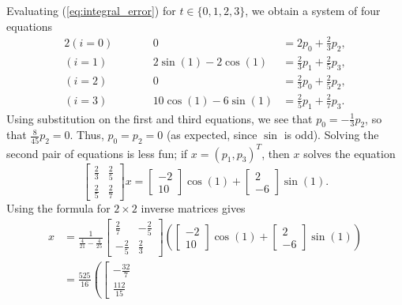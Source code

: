 \documentclass{homework}
\begin{document}
\begin{alphaparts}
		Evaluating (\ref{eq:integral_error}) for $t \in \{0,1,2,3\}$, we obtain a system of four equations
		\begin{alignat}{2}
			(i=0)&& \qquad 0 &= 2p_0+ \frac{2}{3}p_2, \\
			(i=1)&& \qquad 2\sin(1)-2\cos(1) &= \frac{2}{3}p_1 + \frac{2}{5}p_3, \\
			(i=2)&& \qquad 0 &= \frac{2}{3}p_0 + \frac{2}{5}p_2, \\
			(i=3)&& \qquad 10\cos(1) -6\sin(1) &= \frac{2}{5}p_1 + \frac{2}{7}p_3.
		\end{alignat}
		Using substitution on the first and third equations, we see that $p_0 = -\frac{1}{3}p_2$, so that $\frac{8}{45}p_2 = 0$. Thus, $p_0 = p_2 = 0$ (as expected, since $\sin$ is odd). Solving the second pair of equations is less fun; if $x = (p_1, p_3)^T$, then $x$ solves the equation
		\begin{equation}
			\left[\begin{matrix}
				\frac{2}{3} & \frac{2}{5} \\[0.5em]
				\frac{2}{5} & \frac{2}{7}
			\end{matrix}\right] x = \left[\begin{matrix}
				-2 \\
				10
			\end{matrix}\right]\cos(1) + \left[\begin{matrix}
			2 \\
			-6
		\end{matrix}\right]\sin(1).
		\end{equation}
		Using the formula for $2\times 2$ inverse matrices gives
		\begin{align}
			x &= \frac{1}{\frac{4}{21} - \frac{4}{25}}\left[\begin{matrix}
				\frac{2}{7} & -\frac{2}{5} \\[0.5em]
				-\frac{2}{5} & \frac{2}{3}
			\end{matrix}\right]\left(\left[\begin{matrix}
				-2 \\
				10
			\end{matrix}\right]\cos(1) + \left[\begin{matrix}
				2 \\
				-6
			\end{matrix}\right]\sin(1)\right) \\[0.5em]
			&= \frac{525}{16}\left(\left[\begin{matrix}
				-\frac{32}{7} \\[0.5em]
				\frac{112}{15}

\end{matrix}
\end{align}
\end{alphaparts}
\end{document}
